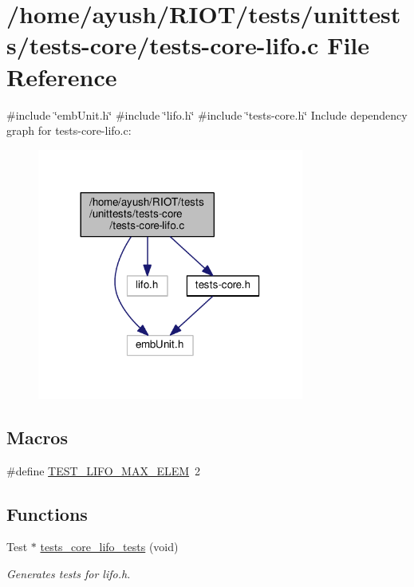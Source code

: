 \hypertarget{tests-core-lifo_8c}{}\section{/home/ayush/\+R\+I\+O\+T/tests/unittests/tests-\/core/tests-\/core-\/lifo.c File Reference}
\label{tests-core-lifo_8c}
{\ttfamily \#include \char`\"{}emb\+Unit.\+h\char`\"{}}\newline
{\ttfamily \#include \char`\"{}lifo.\+h\char`\"{}}\newline
{\ttfamily \#include \char`\"{}tests-\/core.\+h\char`\"{}}\newline
Include dependency graph for tests-\/core-\/lifo.c\+:
\nopagebreak
\begin{figure}[H]
\begin{center}
\leavevmode
\includegraphics[width=248pt]{tests-core-lifo_8c__incl}
\end{center}
\end{figure}
\subsection*{Macros}
\begin{DoxyCompactItemize}
\item 
\#define \hyperlink{tests-core-lifo_8c_a5c56496df3178a70a0728fe27ce61db5}{T\+E\+S\+T\+\_\+\+L\+I\+F\+O\+\_\+\+M\+A\+X\+\_\+\+E\+L\+EM}~2
\end{DoxyCompactItemize}
\subsection*{Functions}
\begin{DoxyCompactItemize}
\item 
Test $\ast$ \hyperlink{group__unittests_ga00403c34e425101181fbebfe68dc0e33}{tests\+\_\+core\+\_\+lifo\+\_\+tests} (void)
\begin{DoxyCompactList}\small\item\em Generates tests for lifo.\+h. \end{DoxyCompactList}\end{DoxyCompactItemize}
